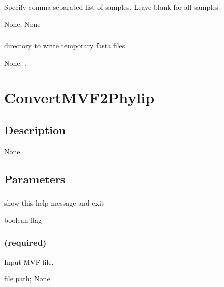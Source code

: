 \documentclass[letterpaper,11pt,english]{sphinxmanual}
\begin{document}
\subsubsection{}
\label{\detokenize{prog_desc:samples}}
 Specify comma-separated list of samples, Leave blank for all samples.

 None;  None


\subsubsection{}
\label{\detokenize{prog_desc:tmpdir}}
 directory to write temporary fasta files

 None;  .


\section{ConvertMVF2Phylip}
\label{\detokenize{prog_desc:convertmvf2phylip}}

\subsection{Description}
\label{\detokenize{prog_desc:id19}}
None


\subsection{Parameters}
\label{\detokenize{prog_desc:id20}}

\subsubsection{}
\label{\detokenize{prog_desc:id21}}
 show this help message and exit

 boolean flag


\subsubsection{ (required)}
\label{\detokenize{prog_desc:id22}}
 Input MVF file.

 file path;  None
\end{document}

